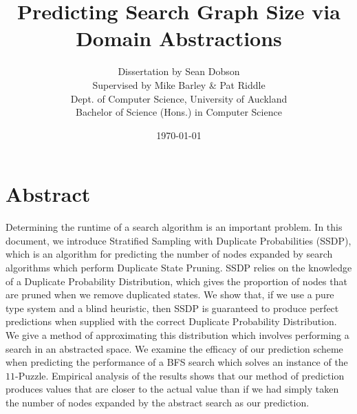 \documentclass{article}
\author{Dissertation by Sean Dobson \\ Supervised by Mike Barley \& Pat Riddle \\ Dept. of Computer Science, University of Auckland \\ Bachelor of Science (Hons.) in Computer Science}
\date{\today}
\title{Predicting Search Graph Size via Domain Abstractions}
\begin{document}
\maketitle

\section{Abstract}
Determining the runtime of a search algorithm is an important problem.
In this document, we introduce Stratified Sampling with Duplicate Probabilities (SSDP),
which is an algorithm for predicting the number of nodes expanded by search algorithms
which perform Duplicate State Pruning. SSDP relies on the knowledge of
a Duplicate Probability Distribution, which gives the proportion of
nodes that are pruned when we remove duplicated states.
We show that, if we use a pure type system and a blind heuristic,
then SSDP is guaranteed to produce perfect predictions when supplied with
the correct Duplicate Probability Distribution.
We give a method of approximating this distribution which
involves performing a search in an abstracted space.
We examine the efficacy of our prediction scheme when predicting the performance
of a BFS search which solves an instance of the \(11\)-Puzzle.
Empirical analysis of the results shows that our method of prediction produces values
that are closer to the actual value than if we had simply taken the number of nodes expanded by the abstract search
as our prediction.
\end{document}
